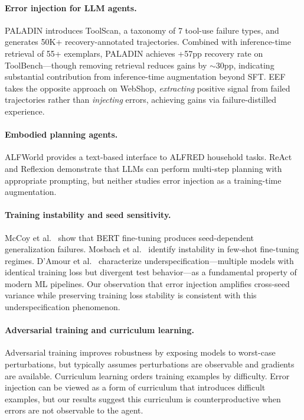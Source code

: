 \documentclass[11pt]{article}
\begin{document}
\paragraph{Error injection for LLM agents.}
PALADIN \cite{chen2025paladin} introduces ToolScan, a taxonomy of 7 tool-use failure types, and generates 50K+ recovery-annotated trajectories.
Combined with inference-time retrieval of 55+ exemplars, PALADIN achieves +57pp recovery rate on ToolBench---though removing retrieval reduces gains by $\sim$30pp, indicating substantial contribution from inference-time augmentation beyond SFT.
EEF \cite{wang2025eef} takes the opposite approach on WebShop, \emph{extracting} positive signal from failed trajectories rather than \emph{injecting} errors, achieving gains via failure-distilled experience.

\paragraph{Embodied planning agents.}
ALFWorld \cite{shridhar2021alfworld} provides a text-based interface to ALFRED household tasks.
ReAct \cite{yao2023react} and Reflexion \cite{shinn2023reflexion} demonstrate that LLMs can perform multi-step planning with appropriate prompting, but neither studies error injection as a training-time augmentation.

\paragraph{Training instability and seed sensitivity.}
McCoy et al.\ \citeyear{mccoy2020berts} show that BERT fine-tuning produces seed-dependent generalization failures.
Mosbach et al.\ \citeyear{mosbach2021few} identify instability in few-shot fine-tuning regimes.
D'Amour et al.\ \citeyear{damour2022underspecification} characterize underspecification---multiple models with identical training loss but divergent test behavior---as a fundamental property of modern ML pipelines.
Our observation that error injection amplifies cross-seed variance while preserving training loss stability is consistent with this underspecification phenomenon.

\paragraph{Adversarial training and curriculum learning.}
Adversarial training \cite{madry2018towards} improves robustness by exposing models to worst-case perturbations, but typically assumes perturbations are observable and gradients are available.
Curriculum learning \cite{bengio2009curriculum} orders training examples by difficulty.
Error injection can be viewed as a form of curriculum that introduces difficult examples, but our results suggest this curriculum is counterproductive when errors are not observable to the agent.
\end{document}
